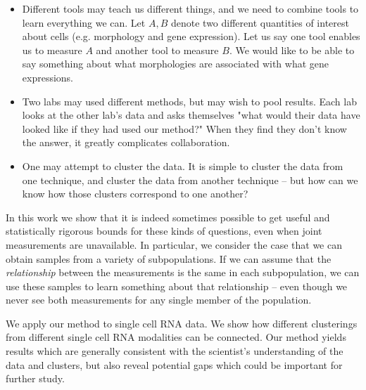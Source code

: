 \begin{itemize}

\item Different tools may teach us different things, and we need to combine tools
to learn everything we can.  Let $A,B$ denote two different quantities of interest about cells (e.g. morphology and gene expression).   Let us say one tool enables us to measure $A$ and another tool to measure $B$.  We would like
to be able to say something about what morphologies are associated with what gene expressions.  

\item Two labs may used different methods, but may wish to pool results.  Each lab looks at the other
lab's data and asks themselves "what would their data have looked like if they had used our method?"  When
they find they don't know the answer, it greatly complicates collaboration.

\item One may attempt to cluster the data.  It is simple to cluster the data from one technique, and cluster the data
from another technique -- but how can we know how those clusters correspond to one another?  

\end{itemize}

In this work we show that it is indeed sometimes possible to get useful and statistically rigorous bounds for these kinds of questions, even when joint measurements are unavailable.   In particular, we consider the case that we can obtain samples from a variety of subpopulations.  If we can assume that the \emph{relationship} between the measurements is the same in each subpopulation, we can use these samples to learn something about that relationship -- even though we never see both measurements for any single member of the population.  

We apply our method to single cell RNA data.  We show how different clusterings from different single cell RNA modalities can be connected.  Our method yields results which are generally consistent with the scientist's understanding of the data and clusters, but also reveal potential gaps which could be important for further study.

